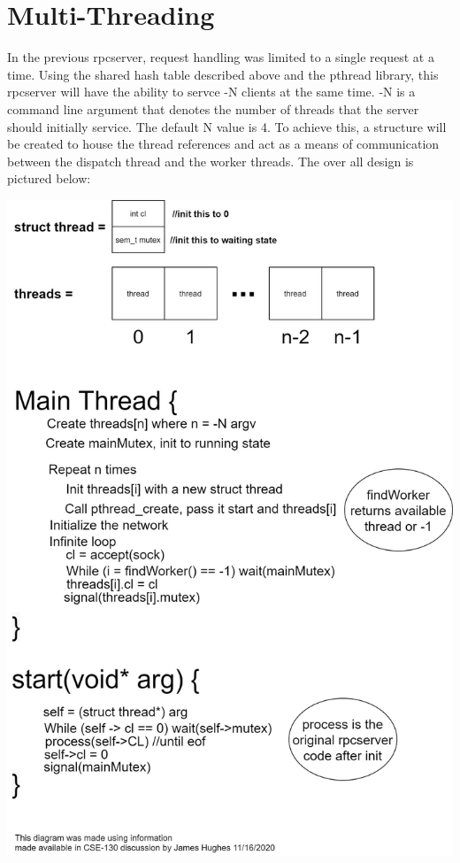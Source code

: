 \documentclass[11pt,letterpaper]{article}
\begin{document}
\section{Multi-Threading}

In the previous rpcserver, request handling was limited to a single request at a time. Using the shared hash table described above and the pthread library, this rpcserver will have the ability to servce -N clients at the same time. -N is a command line argument that denotes the number of threads that the server should initially service. The default N value is 4. To achieve this, a structure will be created to house the thread references and act as a means of communication between the dispatch thread and the worker threads. The over all design is pictured below:
\begin{center}
\includegraphics[scale=.2]{threads.jpg}
\end{center}


\end{document}

